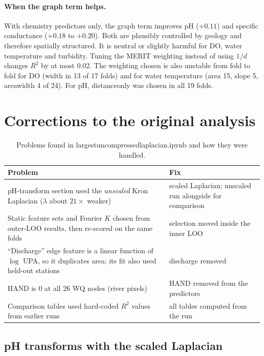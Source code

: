 \documentclass[11pt]{article}
\newcommand{\codeus}{\textunderscore\allowbreak}
\newcommand{\code}[1]{{\ttfamily\let\_\codeus #1}}
\begin{document}
\paragraph{When the graph term helps.} With chemistry predictors only, the graph term improves pH
($+0.11$) and specific conductance ($+0.18$ to $+0.20$). Both are plausibly controlled by geology
and therefore spatially structured. It is neutral or slightly harmful for DO, water temperature and
turbidity. Tuning the MERIT weighting instead of using $1/d$ changes $R^2$ by at most $0.02$. The
weighting chosen is also unstable from fold to fold for DO (\code{width} in 13 of 17 folds) and for
water temperature (\code{area} 15, \code{slope} 5, \code{area\_width} 4 of 24). For pH,
\code{distance\_only} was chosen in all 19 folds.

\section{Corrections to the original analysis}

\begin{table}[h]
\centering
\caption{Problems found in \code{largest\_uncompressed\_laplacian.ipynb} and how they were handled.}
\begin{tabular}{p{}p{}}
\toprule
Problem & Fix \\
\midrule
pH-transform section used the \emph{unscaled} Kron Laplacian ($\lambda$ about $21\times$ weaker) &
scaled Laplacian; unscaled run alongside for comparison \\
Static feature sets and Fourier $K$ chosen from outer-LOO results, then re-scored on the same folds &
selection moved inside the inner LOO \\
``Discharge'' edge feature is a linear function of $\log$ UPA, so it duplicates \code{area};
its fit also used held-out stations &
discharge removed \\
HAND is $0$ at all 26 WQ nodes (river pixels) & HAND removed from the predictors \\
Comparison tables used hard-coded $R^2$ values from earlier runs & all tables computed from the run \\
\bottomrule
\end{tabular}
\end{table}

\subsection{pH transforms with the scaled Laplacian}
\end{document}
